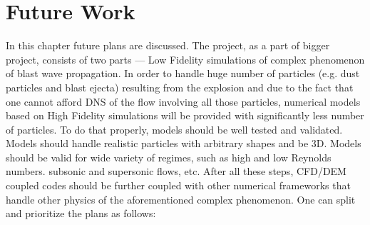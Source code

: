 \chapter{Future Work}
\label{chapter:6}
In this chapter future plans are discussed. The project, as a part of bigger project, consists of two parts --- Low Fidelity simulations of complex phenomenon of blast wave propagation. In order to handle huge number of particles (e.g. dust particles and blast ejecta) resulting from the explosion and due to the fact that  one cannot afford DNS of the flow involving all those particles, numerical models based on High Fidelity simulations will be provided with significantly less number of particles. To do that properly, models should be well tested and validated. Models should handle realistic particles with arbitrary shapes and be 3D. Models should be valid for wide variety of regimes, such as high and low Reynolds numbers. subsonic and supersonic flows, etc. After all these steps, CFD/DEM coupled codes should be further coupled with other numerical frameworks that handle other physics of the aforementioned complex phenomenon. One can split and prioritize the plans as follows:
